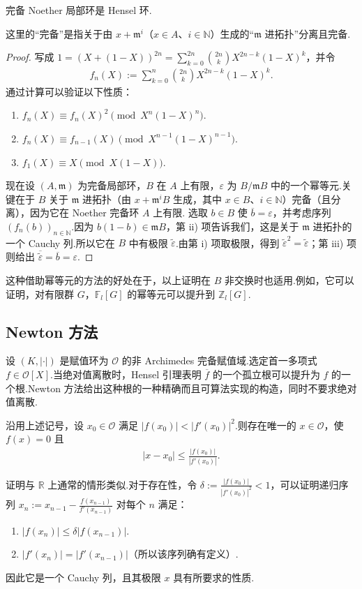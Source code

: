 \begin{theorem*}
完备 Noether 局部环是 Hensel 环.
\end{theorem*}
这里的``完备''是指关于由 $x+\mathfrak m^i$（$x\in A$、$i\in\mathbb N$）生成的``$\mathfrak m$ 进拓扑''分离且完备.
\begin{proof}
写成 $1=(X+(1-X))^{2n}=\sum_{k=0}^{2n}\binom{2n}{k}X^{2n-k}(1-X)^k$，并令
\begin{align*}
f_n(X):=\sum_{k=0}^n\binom{2n}{k}X^{2n-k}(1-X)^k.
\end{align*}
通过计算可以验证以下性质：
\begin{enumerate}[label=\roman*)]
\item $f_n(X)\equiv f_n(X)^2\pmod{X^n(1-X)^n}$.
\item $f_n(X)\equiv f_{n-1}(X)\pmod{X^{n-1}(1-X)^{n-1}}$.
\item $f_1(X)\equiv X\pmod{X(1-X)}$.
\end{enumerate}
现在设 $(A,\mathfrak m)$ 为完备局部环，$B$ 在 $A$ 上有限，$\varepsilon$ 为 $B/\mathfrak mB$ 中的一个幂等元.关键在于 $B$ 关于 $\mathfrak m$ 进拓扑（由 $x+\mathfrak m^iB$ 生成，其中 $x\in B$、$i\in\mathbb N$）完备（且分离），因为它在 Noether 完备环 $A$ 上有限.
选取 $b\in B$ 使 $\overline b=\varepsilon$，并考虑序列 $(f_n(b))_{n\in\mathbb N}$.因为 $b(1-b)\in\mathfrak mB$，第 ii) 项告诉我们，这是关于 $\mathfrak m$ 进拓扑的一个 Cauchy 列.所以它在 $B$ 中有极限 $\widetilde\varepsilon$.由第 i) 项取极限，得到 $\widetilde\varepsilon^2=\widetilde\varepsilon$；第 iii) 项则给出 $\overline{\widetilde\varepsilon}=\overline b=\varepsilon$.
\end{proof}
\begin{remark*}
这种借助幂等元的方法的好处在于，以上证明在 $B$ 非交换时也适用.例如，它可以证明，对有限群 $G$，$\mathbb F_l[G]$ 的幂等元可以提升到 $\mathbb Z_l[G]$.
\end{remark*}
\subsection{Newton 方法}\label{sec:nt-4-3-3}
设 $(K,|\cdot|)$ 是赋值环为 $\mathcal O$ 的非 Archimedes 完备赋值域.选定首一多项式 $f\in\mathcal O[X]$.当绝对值离散时，Hensel 引理表明 $\overline f$ 的一个孤立根可以提升为 $f$ 的一个根.Newton 方法给出这种根的一种精确而且可算法实现的构造，同时不要求绝对值离散.
\begin{theorem*}
沿用上述记号，设 $x_0\in\mathcal O$ 满足 $|f(x_0)|<|f'(x_0)|^2$.则存在唯一的 $x\in\mathcal O$，使 $f(x)=0$ 且
\begin{align*}
|x-x_0|\le\frac{|f(x_0)|}{|f'(x_0)|}.
\end{align*}
\end{theorem*}
证明与 $\mathbb R$ 上通常的情形类似.对于存在性，令 $\delta:=\frac{|f(x_0)|}{|f'(x_0)|^2}<1$，可以证明递归序列 $x_n:=x_{n-1}-\frac{f(x_{n-1})}{f'(x_{n-1})}$ 对每个 $n$ 满足：
\begin{enumerate}[label=\roman*)]
\item $|f(x_n)|\le\delta|f(x_{n-1})|$.
\item $|f'(x_n)|=|f'(x_{n-1})|$（所以该序列确有定义）.
\end{enumerate}
因此它是一个 Cauchy 列，且其极限 $x$ 具有所要求的性质.
